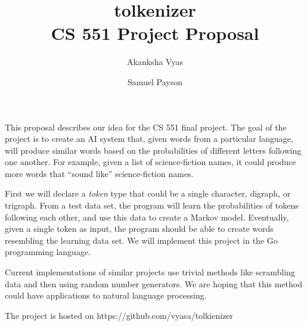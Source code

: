 \documentclass[12pt]{article}
\title{tolkenizer \\ \small{CS 551 Project Proposal}}
\author{Akanksha Vyas \and Samuel Payson}
\begin{document}
\maketitle

This proposal describes our idea for the CS 551 final project. The goal of the
project is to create an AI system that, given words from a particular language,
will produce similar words based on the probabilities of different letters
following one another. For example, given a list of science-fiction names, it
could produce more words that ``sound like'' science-fiction names.

First we will declare a \textit{token} type that could be a single character,
digraph, or trigraph. From a test data set, the program will learn the
probabilities of tokens following each other, and use this data to create a
Markov model. Eventually, given a single token as input, the program should be
able to create words resembling the learning data set. We will implement this
project in the Go programming language.

Current implementations of similar projects use trivial methods like scrambling
data and then using random number generators. We are hoping that this method 
could have applications to natural language processing.

The project is hosted on https://github.com/vyasa/tolkienizer
\end{document}
